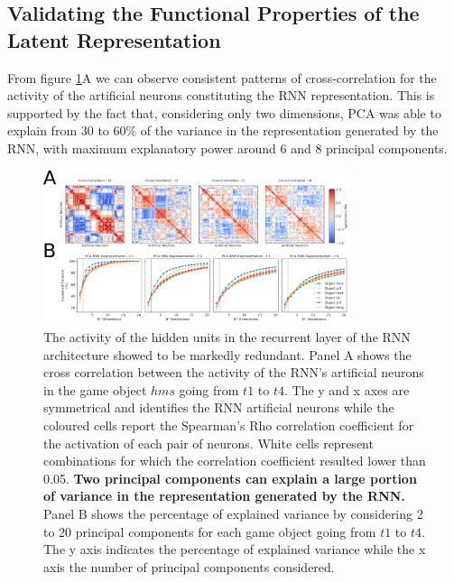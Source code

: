 \subsection{Validating the Functional Properties of the Latent Representation}
From figure \ref{pca_emb}A we can observe consistent patterns of cross-correlation for the activity of the artificial neurons constituting the RNN representation. This is supported by the fact that, considering only two dimensions, PCA was able to explain from 30 to 60\% of the variance in the representation generated by the RNN, with maximum explanatory power around 6 and 8 principal components.
\begin{figure}[h]
\centering
\includegraphics[width=0.8\textwidth]{images/chapter_4/pca_repr_42.png}
\caption[\textbf{Hidden units activation analysis of the RNN architecture}]{The activity of the hidden units in the recurrent layer of the RNN architecture showed to be markedly redundant. Panel A shows the cross correlation between the activity of the RNN's artificial neurons in the game object $hms$ going from $t1$ to $t4$. The y and x axes are symmetrical and identifies the RNN artificial neurons while the coloured cells report the Spearman's Rho correlation coefficient for the activation of each pair of neurons. White cells represent combinations for which the correlation coefficient resulted lower than 0.05. \textbf{Two principal components can explain a large portion of variance in the representation generated by the RNN.} Panel B shows the percentage of explained variance by considering 2 to 20 principal components for each game object going from $t1$ to $t4$. The y axis indicates the percentage of explained variance while the x axis the number of principal components considered.}
\label{pca_emb} 
\end{figure}


